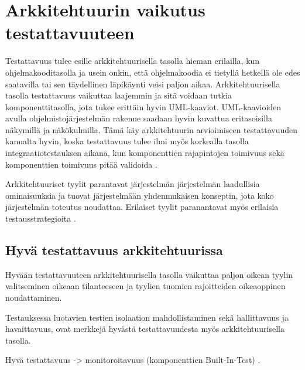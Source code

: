\documentclass[finnish]{tktltiki2}
\theoremstyle{definition}
\theoremstyle{remark}
\begin{document}
\section{Arkkitehtuurin vaikutus testattavuuteen}

Testattavuus tulee esille arkkitehtuurisella tasolla hieman erilailla, kun ohjelmakooditasolla ja usein onkin, että ohjelmakoodia ei tietyllä hetkellä ole edes saatavilla tai sen täydellinen läpikäynti veisi paljon aikaa. Arkkitehtuurisella tasolla testattavuus vaikuttaa laajemmin ja sitä voidaan tutkia komponenttitasolla, jota tukee erittäin hyvin UML-kaaviot. UML-kaavioiden avulla ohjelmistojärjestelmän rakenne saadaan hyvin kuvattua eritasoisilla näkymillä ja näkökulmilla. Tämä käy arkkitehtuurin arvioimiseen testattavuuden kannalta hyvin, koska testattavuus tulee ilmi myös korkealla tasolla integraatiotestauksen aikana, kun komponenttien rajapintojen toimivuus sekä komponenttien toimivuus pitää validoida \citep[s. 65]{Eickelmann:1996:MOS:243327.243602}.


Arkkitehtuuriset tyylit parantavat järjestelmän järjestelmän laadullisia ominaisuuksia ja tuovat järjestelmään yhdenmukaisen konseptin, jota koko järjestelmän toteutus noudattaa. Erilaiset tyylit paranantavat myös erilaisia testausstrategioita \citep[s. 66]{Eickelmann:1996:MOS:243327.243602}. 

\subsection{Hyvä testattavuus arkkitehtuurissa}



Hyvään testattavuuteen arkkitehtuurisella tasolla vaikuttaa paljon oikean tyylin valitseminen oikeaan tilanteeseen ja tyylien tuomien rajoitteiden oikeaoppinen noudattaminen. 

Testauksessa luotavien testien isolaation mahdollistaminen sekä hallittavuus ja havaittavuus, ovat merkkejä hyvästä testattavuudesta myös arkkitehtuurisella tasolla.

Hyvä testattavuus -> monitoroitavuus (komponenttien Built-In-Test) \citep{mari_impact_2003}. 
\end{document}
